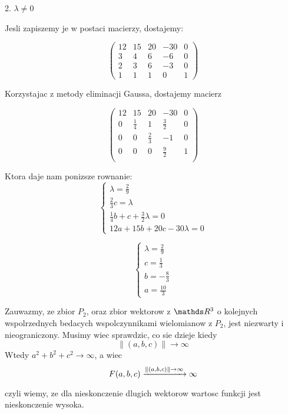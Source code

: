 \documentclass{article}[13pt]
\begin{document}
    {\color{def}2. $\lambda\neq0$}
    \medskip

    Jesli zapiszemy je w postaci macierzy, dostajemy:
    
    $$
        \begin{pmatrix}
            12 &15& 20& -30& 0\\
            3 & 4& 6& -6& 0\\
            2 &3& 6& -3& 0\\
            1& 1& 1& 0& 1
        \end{pmatrix}
    $$

    Korzystajac z metody eliminacji Gaussa, dostajemy macierz

    $$
        \begin{pmatrix}
            12 & 15	& 20&	-30&	0\\
            0&	\frac14	&  1&	\frac32&	0\\
            0	&  0	&\frac23	 &-1&	0\\
            0	&  0	&  0&	\frac92	&1\\
        \end{pmatrix}
    $$

    Ktora daje nam ponizsze rownanie:
    $$
        \begin{cases}
            \lambda=\frac29\\
            \frac23c=\lambda\\
            \frac14b+c+\frac32\lambda=0\\
            12a+15b+20c-30\lambda=0
        \end{cases}
    $$

    $$
        \begin{cases}
            \lambda=\frac29\\
            c=\frac13\\
            b=-\frac83\\
            a=\frac{10}3
        \end{cases}
    $$

    Zauwazmy, ze zbior $P_2$, oraz zbior wektorow z $\R^3$ o kolejnych wspolrzednych bedacych wspolczynnikami wielomianow z $P_2$, jest niezwarty i nieograniczony. Musimy wiec sprawdzic, co sie dzieje kiedy
    $$\|(a,b,c)\|\to\infty$$
    Wtedy $a^2+b^2+c^2\to\infty$, a wiec 
    $$F(a,b,c)\xrightarrow[]{\|(a,b,c)\|\to\infty}\infty$$

    czyli wiemy, ze dla nieskonczenie dlugich wektorow wartosc funkcji jest nieskonczenie wysoka.
    \medskip
\end{document}
